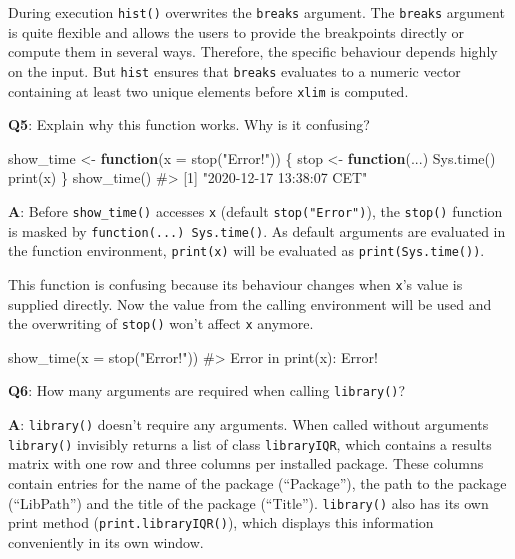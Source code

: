 \documentclass[
]{krantz}
\makeatletter
\newenvironment{Shaded}{\begin{snugshade}}{\end{snugshade}}
\newcommand{\CommentTok}[1]{\textcolor[rgb]{0.56,0.35,0.01}{\textit{#1}}}
\newcommand{\ControlFlowTok}[1]{\textcolor[rgb]{0.13,0.29,0.53}{\textbf{#1}}}
\newcommand{\DataTypeTok}[1]{\textcolor[rgb]{0.13,0.29,0.53}{#1}}
\newcommand{\KeywordTok}[1]{\textcolor[rgb]{0.13,0.29,0.53}{\textbf{#1}}}
\newcommand{\NormalTok}[1]{#1}
\newcommand{\StringTok}[1]{\textcolor[rgb]{0.31,0.60,0.02}{#1}}
\newenvironment{kframe}{%
\medskip{}
\setlength{\fboxsep}{.8em}
 \def\at@end@of@kframe{}%
 \ifinner\ifhmode%
  \def\at@end@of@kframe{\end{minipage}}%
  \begin{minipage}{\columnwidth}%
 \fi\fi%
 \def\FrameCommand##1{\hskip\@totalleftmargin \hskip-\fboxsep
 \colorbox{shadecolor}{##1}\hskip-\fboxsep
     \hskip-\linewidth \hskip-\@totalleftmargin \hskip\columnwidth}%
 \MakeFramed {\advance\hsize-\width
   \@totalleftmargin\z@ \linewidth\hsize
   \@setminipage}}%
 {\par\unskip\endMakeFramed%
 \at@end@of@kframe}
\renewenvironment{Shaded}{\begin{kframe}}{\end{kframe}}
\renewcommand{\KeywordTok} [1]{\textcolor[rgb]{0.00,0.44,0.13}{{#1}}}
\renewcommand{\DataTypeTok}[1]{\textcolor[rgb]{0.56,0.13,0.00}{{#1}}}
\renewcommand{\StringTok}  [1]{\textcolor[rgb]{0.25,0.44,0.63}{{#1}}}
\renewcommand{\CommentTok} [1]{\textcolor[rgb]{0.38,0.63,0.69}{{#1}}}
\renewcommand{\NormalTok}  [1]{{#1}}
\makeatother
\begin{document}
During execution \texttt{hist()} overwrites the \texttt{breaks} argument. The \texttt{breaks} argument is quite flexible and allows the users to provide the breakpoints directly or compute them in several ways. Therefore, the specific behaviour depends highly on the input. But \texttt{hist} ensures that \texttt{breaks} evaluates to a numeric vector containing at least two unique elements before \texttt{xlim} is computed.

\textbf{{Q5}}: Explain why this function works. Why is it confusing?

\begin{Shaded}
\begin{Highlighting}[]
\NormalTok{show_time <-}\StringTok{ }\ControlFlowTok{function}\NormalTok{(}\DataTypeTok{x =} \KeywordTok{stop}\NormalTok{(}\StringTok{"Error!"}\NormalTok{)) \{}
\NormalTok{  stop <-}\StringTok{ }\ControlFlowTok{function}\NormalTok{(...) }\KeywordTok{Sys.time}\NormalTok{()}
  \KeywordTok{print}\NormalTok{(x)}
\NormalTok{\}}
\KeywordTok{show_time}\NormalTok{()}
\CommentTok{#> [1] "2020-12-17 13:38:07 CET"}
\end{Highlighting}
\end{Shaded}

\textbf{{A}}: Before \texttt{show\_time()} accesses \texttt{x} (default \texttt{stop("Error")}), the \texttt{stop()} function is masked by \texttt{function(...)\ Sys.time()}. As default arguments are evaluated in the function environment, \texttt{print(x)} will be evaluated as \texttt{print(Sys.time())}.

This function is confusing because its behaviour changes when \texttt{x}'s value is supplied directly. Now the value from the calling environment will be used and the overwriting of \texttt{stop()} won't affect \texttt{x} anymore.

\begin{Shaded}
\begin{Highlighting}[]
\KeywordTok{show_time}\NormalTok{(}\DataTypeTok{x =} \KeywordTok{stop}\NormalTok{(}\StringTok{"Error!"}\NormalTok{))}
\CommentTok{#> Error in print(x): Error!}
\end{Highlighting}
\end{Shaded}

\textbf{{Q6}}: How many arguments are required when calling \texttt{library()}?

\textbf{{A}}: \texttt{library()} doesn't require any arguments. When called without arguments \texttt{library()} invisibly returns a list of class \texttt{libraryIQR}, which contains a results matrix with one row and three columns per installed package. These columns contain entries for the name of the package (``Package''), the path to the package (``LibPath'') and the title of the package (``Title''). \texttt{library()} also has its own print method (\texttt{print.libraryIQR()}), which displays this information conveniently in its own window.
\end{document}
